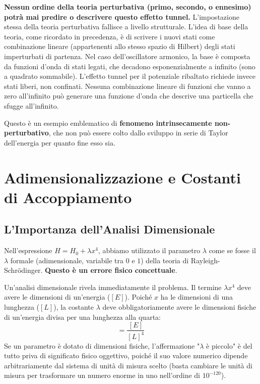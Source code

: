 \textbf{Nessun ordine della teoria perturbativa (primo, secondo, o ennesimo) potrà mai predire o descrivere questo effetto tunnel.} L'impostazione stessa della teoria perturbativa fallisce a livello strutturale.
L'idea di base della teoria, come ricordato in precedenza, è di scrivere i nuovi stati come combinazione lineare (appartenenti allo stesso spazio di Hilbert) degli stati imperturbati di partenza. Nel caso dell'oscillatore armonico, la base è composta da funzioni d'onda di stati legati, che decadono esponenzialmente a infinito (sono a quadrato sommabile). L'effetto tunnel per il potenziale ribaltato richiede invece stati liberi, non confinati. Nessuna combinazione lineare di funzioni che vanno a zero all'infinito può generare una funzione d'onda che descrive una particella che sfugge all'infinito.

Questo è un esempio emblematico di \textbf{fenomeno intrinsecamente non-perturbativo}, che non può essere colto dallo sviluppo in serie di Taylor dell'energia per quanto fine esso sia.

\section{Adimensionalizzazione e Costanti di Accoppiamento}

\subsection{L'Importanza dell'Analisi Dimensionale}
Nell'espressione $H = H_0 + \lambda x^4$, abbiamo utilizzato il parametro $\lambda$ come se fosse il $\lambda$ formale (adimensionale, variabile tra $0$ e $1$) della teoria di Rayleigh-Schrödinger. \textbf{Questo è un errore fisico concettuale}.

Un'analisi dimensionale rivela immediatamente il problema. Il termine $\lambda x^4$ deve avere le dimensioni di un'energia ($[E]$). Poiché $x$ ha le dimensioni di una lunghezza ($[L]$), la costante $\lambda$ deve obbligatoriamente avere le dimensioni fisiche di un'energia divisa per una lunghezza alla quarta:
\begin{equation}
[\lambda] = \frac{[E]}{[L]^4}
\end{equation}
Se un parametro è dotato di dimensioni fisiche, l'affermazione "$\lambda$ è piccolo" è del tutto priva di significato fisico oggettivo, poiché il suo valore numerico dipende arbitrariamente dal sistema di unità di misura scelto (basta cambiare le unità di misura per trasformare un numero enorme in uno nell'ordine di $10^{-120}$).


